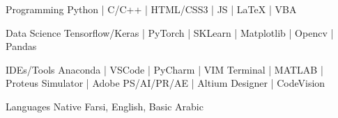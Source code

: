 


\begin{cvskills}


\cvskill
{Programming} %
{Python | C/C++ | HTML/CSS3 | JS | LaTeX | VBA} %


\cvskill
{Data Science} %
{Tensorflow/Keras | PyTorch | SKLearn | Matplotlib | Opencv | Pandas} %


\cvskill
{IDEs/Tools} %
{Anaconda | VSCode | PyCharm | VIM Terminal | MATLAB | Proteus Simulator | Adobe PS/AI/PR/AE | Altium Designer | CodeVision} %


\cvskill
{Languages} %
{Native Farsi, English, Basic Arabic} %


\end{cvskills}